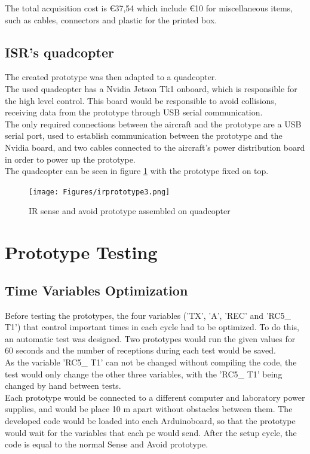 The total acquisition cost is \euro{37,54} which include \euro{10} for miscellaneous items, such as cables, connectors and plastic for the printed box.\\

\subsection{ISR's quadcopter}
\label{subsection:IRpisr}
The created prototype was then adapted to a quadcopter. \\
The used quadcopter has a Nvidia Jetson Tk1 onboard, which is responsible for the high level control. This board would be responsible to avoid collisions, receiving data from the prototype through USB serial communication.\\
The only required connections between the aircraft and the prototype are a USB serial port, used to establish communication between the prototype and the Nvidia board, and two cables connected to the aircraft's power distribution board in order to power up the prototype.\\
The quadcopter can be seen in figure \ref{fig:irprototype3} with the prototype fixed on top.\\

\begin{figure}[!htb]
  \centering
  \texttt{[image: Figures/irprototype3.png]}
  \caption[IR Sense and Avoid Prototype Assembled on Quadcopter]{IR sense and avoid prototype assembled on quadcopter}
  \label{fig:irprototype3}
\end{figure}

\section{Prototype Testing}
\label{section:prototypetest}
\subsection{Time Variables Optimization}
\label{subsection:opt}
Before testing the prototypes, the four variables ('TX', 'A', 'REC' and 'RC5\_ T1') that control important times in each cycle had to be optimized. To do this, an automatic test was designed. Two prototypes would run the given values for 60 seconds and the number of receptions during each test would be saved.\\
As the variable 'RC5\_ T1' can not be changed without compiling the code, the test would only change the other three variables, with the 'RC5\_ T1' being changed by hand between tests.\\
Each prototype would be connected to a different computer and laboratory power supplies, and would be place 10 m apart without obstacles between them.  The developed code would be loaded into each Arduino\texttrademark board, so that the prototype would wait for the variables that each pc would send. After the setup cycle, the code is equal to the normal Sense and Avoid prototype.\\

